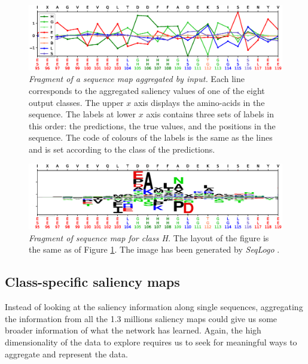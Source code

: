 	
	\begin{figure}
	\centering
	\includegraphics[width=1\linewidth]{Figures/sample_8classes}
	\caption{\textit{Fragment of a sequence map aggregated by input.} Each line corresponds to the aggregated saliency values of one of the eight output classes. The upper $x$ axis displays the amino-acids in the sequence. The labels at lower $x$ axis contains three sets of labels in this order: the predictions, the true values, and the positions in the sequence. The code of colours of the labels is the same as the lines and is set according to the class of the predictions.}
	\label{fig:sample_8classes}
	\end{figure}
	
	\begin{figure}
	\centering
	\includegraphics[width=1\linewidth]{Figures/sample_Hclass}
	\caption{\textit{Fragment of sequence map for class H.} The layout of the figure is the same as of Figure \ref{fig:sample_8classes}. The image has been generated by \textit{SeqLogo} \cite{Thomsen2012}.}
	\label{fig:sample_Hclass}
	\end{figure}

	

	\subsection{Class-specific saliency maps}
	Instead of looking at the saliency information along single sequences, aggregating the information from all the 1.3 millions saliency maps could give us some broader information of what the network has learned. Again, the high dimensionality of the data to explore requires us to seek for meaningful ways to aggregate and represent the data.
	
